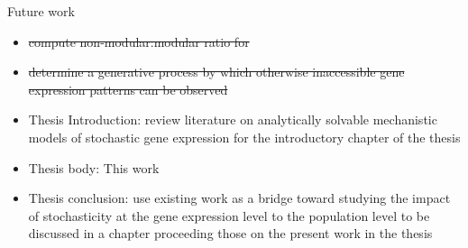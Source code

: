 \begin{frame}
\begin{footnotesize}
\begin{block}{Future work}
\begin{itemize}
\item \sout{compute non-modular:modular ratio for}
\begin{enumerate}
\end{enumerate}
\item \sout{determine a generative process by which otherwise inaccessible gene expression patterns can be observed}
\item Thesis Introduction: review literature on analytically solvable mechanistic models of stochastic gene expression \cite{Walczak2012,Mugler2009,Walczak2005,Walczak2009,Sasai2003,Mora2013} for the introductory chapter of the thesis
\item Thesis body: This work
\item Thesis conclusion: use existing work as a bridge toward studying the impact of stochasticity at the gene expression level to the population level to be discussed in a chapter proceeding those on the present work in the thesis \cite{Mora2013,Smith2011b,Smith2011c,Smith2011}
\end{itemize}
\end{block}
\end{footnotesize}
\end{frame}

